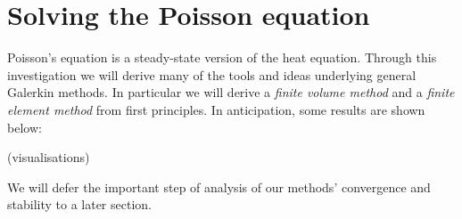 \section{Solving the Poisson equation}
Poisson's equation is a steady-state version of the heat equation.
Through this investigation we will derive many of the tools and ideas underlying general Galerkin methods.
In particular we will derive a \textit{finite volume method} and a \textit{finite element method} from first principles.
In anticipation, some results are shown below:

\vskip 0.2in
(visualisations)
\vskip 0.2in

We will defer the important step of analysis of our methods' convergence and stability to a later section.

